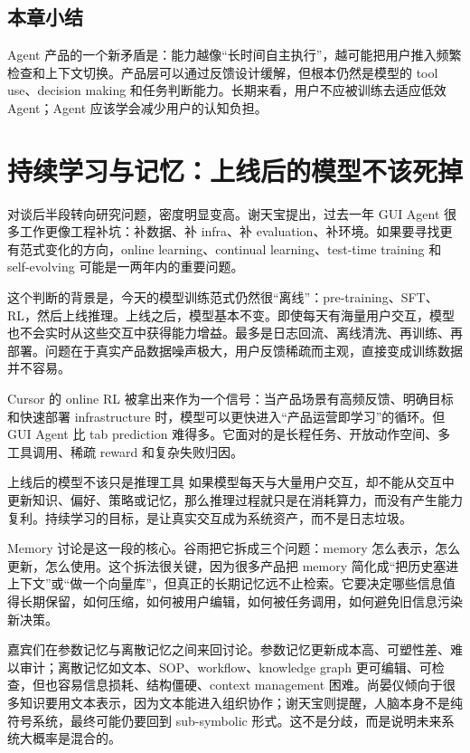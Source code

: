\documentclass[a4paper]{article}
\begin{document}
\subsection{本章小结}

Agent 产品的一个新矛盾是：能力越像“长时间自主执行”，越可能把用户推入频繁检查和上下文切换。产品层可以通过反馈设计缓解，但根本仍然是模型的 tool use、decision making 和任务判断能力。长期来看，用户不应被训练去适应低效 Agent；Agent 应该学会减少用户的认知负担。

\section{持续学习与记忆：上线后的模型不该死掉}

对谈后半段转向研究问题，密度明显变高。谢天宝提出，过去一年 GUI Agent 很多工作更像工程补坑：补数据、补 infra、补 evaluation、补环境。如果要寻找更有范式变化的方向，online learning、continual learning、test-time training 和 self-evolving 可能是一两年内的重要问题。

这个判断的背景是，今天的模型训练范式仍然很“离线”：pre-training、SFT、RL，然后上线推理。上线之后，模型基本不变。即使每天有海量用户交互，模型也不会实时从这些交互中获得能力增益。最多是日志回流、离线清洗、再训练、再部署。问题在于真实产品数据噪声极大，用户反馈稀疏而主观，直接变成训练数据并不容易。

Cursor 的 online RL 被拿出来作为一个信号：当产品场景有高频反馈、明确目标和快速部署 infrastructure 时，模型可以更快进入“产品运营即学习”的循环。但 GUI Agent 比 tab prediction 难得多。它面对的是长程任务、开放动作空间、多工具调用、稀疏 reward 和复杂失败归因。

\begin{importantbox}{上线后的模型不该只是推理工具}
如果模型每天与大量用户交互，却不能从交互中更新知识、偏好、策略或记忆，那么推理过程就只是在消耗算力，而没有产生能力复利。持续学习的目标，是让真实交互成为系统资产，而不是日志垃圾。
\end{importantbox}

Memory 讨论是这一段的核心。谷雨把它拆成三个问题：memory 怎么表示，怎么更新，怎么使用。这个拆法很关键，因为很多产品把 memory 简化成“把历史塞进上下文”或“做一个向量库”，但真正的长期记忆远不止检索。它要决定哪些信息值得长期保留，如何压缩，如何被用户编辑，如何被任务调用，如何避免旧信息污染新决策。

嘉宾们在参数记忆与离散记忆之间来回讨论。参数记忆更新成本高、可塑性差、难以审计；离散记忆如文本、SOP、workflow、knowledge graph 更可编辑、可检查，但也容易信息损耗、结构僵硬、context management 困难。尚晏仪倾向于很多知识要用文本表示，因为文本能进入组织协作；谢天宝则提醒，人脑本身不是纯符号系统，最终可能仍要回到 sub-symbolic 形式。这不是分歧，而是说明未来系统大概率是混合的。
\end{document}
